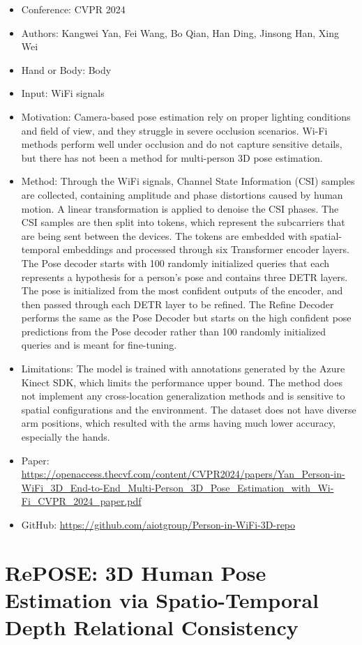 \documentclass{article}
\begin{document}
\begin{itemize}
    \item Conference: CVPR 2024
    \item Authors: Kangwei Yan, Fei Wang, Bo Qian, Han Ding, Jinsong Han, Xing Wei
    \item Hand or Body: Body
    \item Input: WiFi signals
    \item Motivation: Camera-based pose estimation rely on proper lighting conditions and field of view, and they struggle in severe occlusion scenarios. Wi-Fi methods perform well under occlusion and do not capture sensitive details, but there has not been a method for multi-person 3D pose estimation.
    \item Method: Through the WiFi signals, Channel State Information (CSI) samples are collected, containing amplitude and phase distortions caused by human motion. A linear transformation is applied to denoise the CSI phases. The CSI samples are then split into tokens, which represent the subcarriers that are being sent between the devices. The tokens are embedded with spatial-temporal embeddings and processed through six Transformer encoder layers. The Pose decoder starts with 100 randomly initialized queries that each represents a hypothesis for a person's pose and contains three DETR layers. The pose is initialized from the most confident outputs of the encoder, and then passed through each DETR layer to be refined. The Refine Decoder performs the same as the Pose Decoder but starts on the high confident pose predictions from the Pose decoder rather than 100 randomly initialized queries and is meant for fine-tuning.
    \item Limitations: The model is trained with annotations generated by the Azure Kinect SDK, which limits the performance upper bound. The method does not implement any cross-location generalization methods and is sensitive to spatial configurations and the environment. The dataset does not have diverse arm positions, which resulted with the arms having much lower accuracy, especially the hands.
    \item Paper: \url{https://openaccess.thecvf.com/content/CVPR2024/papers/Yan_Person-in-WiFi_3D_End-to-End_Multi-Person_3D_Pose_Estimation_with_Wi-Fi_CVPR_2024_paper.pdf}
    \item GitHub: \url{https://github.com/aiotgroup/Person-in-WiFi-3D-repo}
\end{itemize}

\section*{RePOSE\@: 3D Human Pose Estimation via Spatio-Temporal Depth Relational Consistency}
\end{document}
